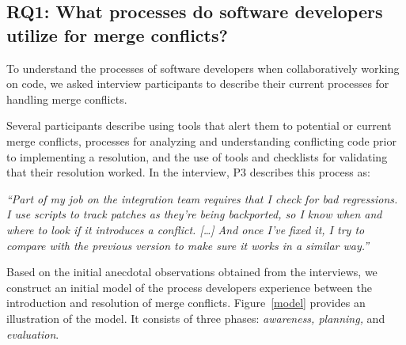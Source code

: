
\subsection{\textbf{RQ1:} What processes do software developers utilize for merge conflicts?}\label{RQ1}

To understand the processes of software developers when collaboratively working on code, we asked interview participants to describe their current processes for handling merge conflicts.

Several participants describe using tools that alert them to potential or current merge conflicts, processes for analyzing and understanding conflicting code prior to implementing a resolution, and the use of tools and checklists for validating that their resolution worked.
In the interview, P3 describes this process as:
\begin{quoting}
\textit{``Part of my job on the integration team requires that I check for bad regressions. I use scripts to track patches as they're being backported, so I know when and where to look if it introduces a conflict. [\ldots] And once I've fixed it, I try to compare with the previous version to make sure it works in a similar way.''}
\end{quoting}

Based on the initial anecdotal observations obtained from the interviews, we construct an initial model of the process developers experience between the introduction and resolution of merge conflicts.
Figure~\ref{model} provides an illustration of the model.
It consists of three phases: \emph{awareness, planning,} and \emph{evaluation}.

